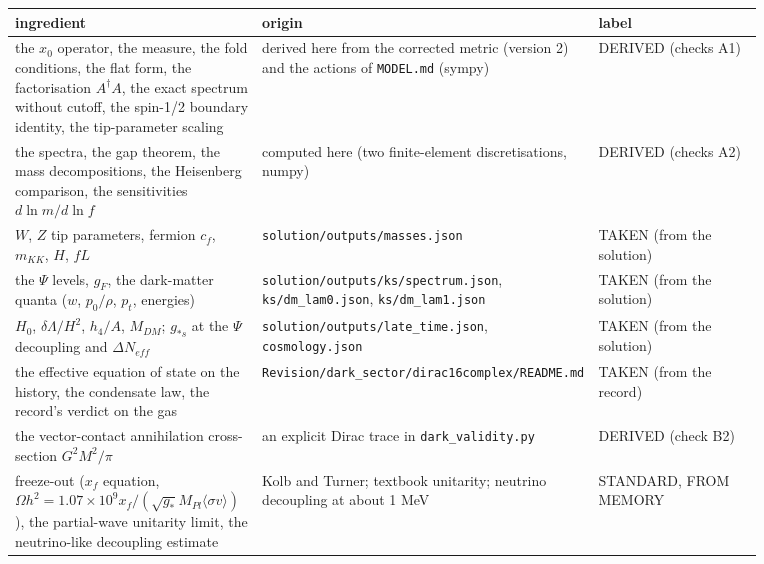 \documentclass[11pt]{article}
\begin{document}
\begin{longtable}{>{\raggedright\arraybackslash}p{0.333\linewidth}>{\raggedright\arraybackslash}p{0.309\linewidth}>{\raggedright\arraybackslash}p{0.227\linewidth}}
\toprule
\textbf{ingredient} & \textbf{origin} & \textbf{label} \\
\midrule
the $x_0$ operator, the measure, the fold conditions, the flat form, the factorisation $A^\dagger A$, the exact spectrum without cutoff, the spin-1/2 boundary identity, the tip-parameter scaling & derived here from the corrected metric (version 2) and the actions of \texttt{MODEL.\allowbreak{}md} (sympy) & DERIVED (checks A1) \\
the spectra, the gap theorem, the mass decompositions, the Heisenberg comparison, the sensitivities $d\ln m/d\ln f$ & computed here (two finite-element discretisations, numpy) & DERIVED (checks A2) \\
$W$, $Z$ tip parameters, fermion $c_f$, $m_{KK}$, $H$, $fL$ & \texttt{solution/\allowbreak{}outputs/\allowbreak{}masses.\allowbreak{}json} & TAKEN (from the solution) \\
the $\Psi$ levels, $g_F$, the dark-matter quanta ($w$, $p_0/\rho$, $p_t$, energies) & \texttt{solution/\allowbreak{}outputs/\allowbreak{}ks/\allowbreak{}spectrum.\allowbreak{}json}, \texttt{ks/\allowbreak{}dm\_\allowbreak{}lam0.\allowbreak{}json}, \texttt{ks/\allowbreak{}dm\_\allowbreak{}lam1.\allowbreak{}json} & TAKEN (from the solution) \\
$H_0$, $\delta\Lambda/H^2$, $h_4/A$, $M_{DM}$; $g_{*s}$ at the $\Psi$ decoupling and $\Delta N_{eff}$ & \texttt{solution/\allowbreak{}outputs/\allowbreak{}late\_\allowbreak{}time.\allowbreak{}json}, \texttt{cosmology.\allowbreak{}json} & TAKEN (from the solution) \\
the effective equation of state on the history, the condensate law, the record's verdict on the gas & \texttt{Revision/\allowbreak{}dark\_\allowbreak{}sector/\allowbreak{}dirac16complex/\allowbreak{}README.\allowbreak{}md} & TAKEN (from the record) \\
the vector-contact annihilation cross-section $G^2M^2/\pi$ & an explicit Dirac trace in \texttt{dark\_\allowbreak{}validity.\allowbreak{}py} & DERIVED (check B2) \\
freeze-out ($x_f$ equation, $\Omega h^2 = 1.07\times10^9x_f/(\sqrt{g_*}M_{Pl}\langle\sigma v\rangle)$), the partial-wave unitarity limit, the neutrino-like decoupling estimate & Kolb and Turner; textbook unitarity; neutrino decoupling at about 1 MeV & STANDARD, FROM MEMORY \\

\end{longtable}
\end{document}

